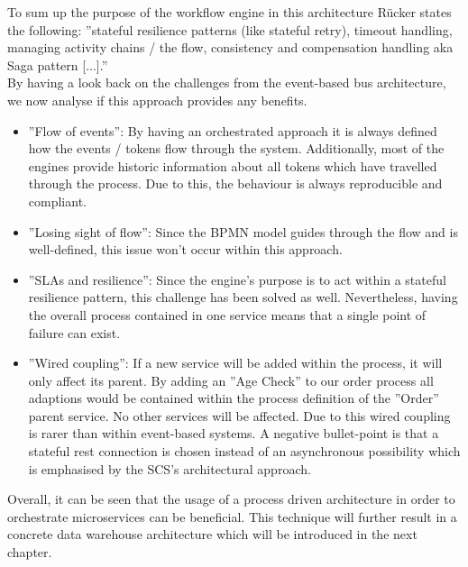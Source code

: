 To sum up the purpose of the workflow engine in this architecture Rücker states the following: ''stateful resilience patterns (like stateful retry), timeout handling, managing activity chains / the flow, consistency and compensation handling aka Saga pattern [...].'' \cite{orchestrationMicroServices}\newline
\\
By having a look back on the challenges from the event-based bus architecture, we now analyse if this approach provides any benefits. \\
\begin{itemize}
    \item ''Flow of events'': By having an orchestrated approach it is always defined how the events / tokens flow through the system. Additionally, most of the engines provide historic information about all tokens which have travelled through the process. Due to this, the behaviour is always reproducible and compliant. 
    \item ''Losing sight of flow'': Since the BPMN model guides through the flow and is well-defined, this issue won't occur within this approach.
    \item ''SLAs and resilience'': Since the engine's purpose is to act within a stateful resilience pattern, this challenge has been solved as well. Nevertheless, having the overall process contained in one service means that a single point of failure can exist. 
    \item ''Wired coupling'': If a new service will be added within the process, it will only affect its parent. By adding an ''Age Check'' to our order process all adaptions would be contained within the process definition of the ''Order'' parent service. No other services will be affected. Due to this wired coupling is rarer than within event-based systems. A negative bullet-point is that a stateful \acrshort{rest} connection is chosen instead of an asynchronous possibility which is emphasised by the SCS's architectural approach. 
\end{itemize}
Overall, it can be seen that the usage of a process driven architecture in order to orchestrate microservices can be beneficial. This technique will further result in a concrete data warehouse architecture which will be introduced in the next chapter. 
